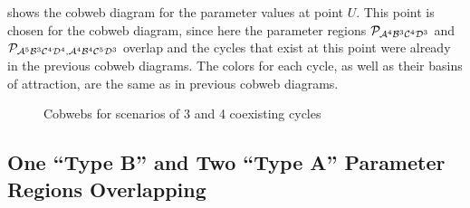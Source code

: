  shows the cobweb diagram for the parameter values at point $U$.
This point is chosen for the cobweb diagram, since here the parameter regions $\mathcal{P}_{\mathcal{A}^4\mathcal{B}^3\mathcal{C}^4\mathcal{D}^3}$ and $\mathcal{P}_{\mathcal{A}^5\mathcal{B}^3\mathcal{C}^4\mathcal{D}^4, \mathcal{A}^4\mathcal{B}^4\mathcal{C}^5\mathcal{D}^3}$ overlap and the cycles that exist at this point were already in the previous cobweb diagrams.
The colors for each cycle, as well as their basins of attraction, are the same as in previous cobweb diagrams.

\begin{figure}
	\centering
	\caption{Cobwebs for scenarios of 3 and 4 coexisting cycles}
\end{figure}

\subsection{One ``Type B'' and Two ``Type A'' Parameter Regions Overlapping}

